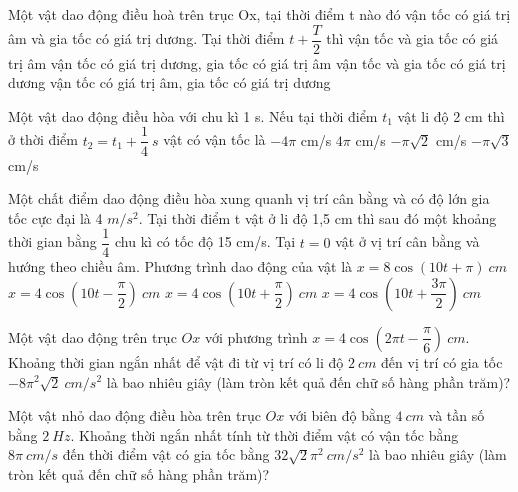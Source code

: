 \begin{ex}%
Một vật dao động điều hoà trên trục Ox, tại thời điểm t nào đó vận tốc có giá trị âm và gia tốc có giá trị dương. Tại thời điểm $t + \dfrac{T}{2}$ thì
\choice
{vận tốc và gia tốc có giá trị âm}
{\True vận tốc có giá trị dương, gia tốc có giá trị âm}
{vận tốc và gia tốc có giá trị dương}
{vận tốc có giá trị âm, gia tốc có giá trị dương}
\end{ex} 

\begin{ex}%
Một vật dao động điều hòa với chu kì 1 s. Nếu tại thời điểm $t_1$ vật li độ 2 cm thì ở thời điểm $t_2=t_1+\dfrac{1}{4}\ s$ vật có vận tốc là
\choice
{\True $-4\pi $ cm/s}
{$4\pi $ cm/s}
{$-\pi \sqrt{2}$ cm/s}
{$-\pi \sqrt{3}$ cm/s}
\end{ex} 
 
\begin{ex}%
Một chất điểm dao động điều hòa xung quanh vị trí cân bằng và có độ lớn gia tốc cực đại là 4 $m/s^2$. Tại thời điểm t vật ở li độ 1,5 cm thì sau đó một khoảng thời gian bằng $\dfrac{1}{4}$ chu kì có tốc độ 15 cm/s. Tại $t = 0$ vật ở vị trí cân bằng và hướng theo chiều âm. Phương trình dao động của vật là
\choice
{$x=8\cos (10t+\pi)\  cm$}
{$x=4\cos (10t-\dfrac{\pi}{2})\  cm$}
{\True $x=4\cos (10t+\dfrac{\pi}{2})\  cm$}
{$x=4\cos (10t+\dfrac{3\pi}{2})\  cm$}
\end{ex} 
\begin{ex}%
Một vật dao động trên trục $O x$ với phương trình $x=4 \cos \left(2 \pi t-\dfrac{\pi}{6}\right)\ cm$. Khoảng thời gian ngắn nhất để vật đi từ vị trí có li độ $2 \ cm$ đến vị trí có gia tốc $-8 \pi^2 \sqrt{2}\ cm/s^2$ là bao nhiêu giây (làm tròn kết quả đến chữ số hàng phần trăm)?
\end{ex} 
\begin{ex}%
Một vật nhỏ dao động điều hòa trên trục $Ox$ với biên độ bằng $4 \ cm$ và tần số bằng $2 \ Hz$. Khoảng thời ngắn nhất tính từ thời điểm vật có vận tốc bằng $8 \pi\ cm/s$ đến thời điểm vật có gia tốc bằng $32 \sqrt{2} \pi^2\ cm/s^2$ là bao nhiêu giây (làm tròn kết quả đến chữ số hàng phần trăm)?
\shortans[oly]{ }
\end{ex} 
